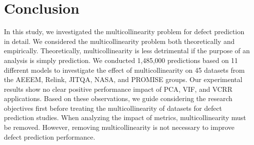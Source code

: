 \chapter{Conclusion}
\thispagestyle{fancy}
\label{sec:conclusion}
\bigskip In this study, we investigated the multicollinearity problem for defect prediction in detail. We considered the multicollinearity problem both theoretically and empirically. Theoretically, multicollinearity is less detrimental if the purpose of an analysis is simply prediction.
We conducted 1,485,000 predictions based on 11 different models to investigate the effect of multicollinearity on 45 datasets from the AEEEM, Relink, JIT\textunderscore QA, NASA, and PROMISE groups. Our experimental results show no clear positive performance impact of PCA, VIF, and VCRR applications.
Based on these observations, we guide considering the research objectives first before treating the multicollinearity of datasets for defect prediction studies. When analyzing the impact of metrics, multicollinearity must be removed. However, removing multicollinearity is not necessary to improve defect prediction performance.
\clearpage